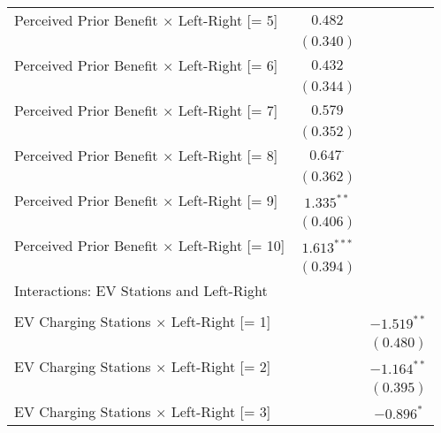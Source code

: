 \begin{center}
\begin{tiny}
\begin{longtable}{l@{} c@{} c@{}}
\quad Perceived Prior Benefit $\times$ Left-Right [= 5]  & $0.482$          &                  \\
                                                         & $(0.340)$        &                  \\
\quad Perceived Prior Benefit $\times$ Left-Right [= 6]  & $0.432$          &                  \\
                                                         & $(0.344)$        &                  \\
\quad Perceived Prior Benefit $\times$ Left-Right [= 7]  & $0.579$          &                  \\
                                                         & $(0.352)$        &                  \\
\quad Perceived Prior Benefit $\times$ Left-Right [= 8]  & $0.647^{\cdot}$  &                  \\
                                                         & $(0.362)$        &                  \\
\quad Perceived Prior Benefit $\times$ Left-Right [= 9]  & $1.335^{**}$     &                  \\
                                                         & $(0.406)$        &                  \\
\quad Perceived Prior Benefit $\times$ Left-Right [= 10] & $1.613^{***}$    &                  \\
                                                         & $(0.394)$        &                  \\
Interactions: EV Stations and Left-Right                 &                  &                  \\
                                                         &                  &                  \\
\quad EV Charging Stations $\times$ Left-Right [= 1]     &                  & $-1.519^{**}$    \\
                                                         &                  & $(0.480)$        \\
\quad EV Charging Stations $\times$ Left-Right [= 2]     &                  & $-1.164^{**}$    \\
                                                         &                  & $(0.395)$        \\
\quad EV Charging Stations $\times$ Left-Right [= 3]     &                  & $-0.896^{*}$     \\

\end{longtable}
\end{tiny}
\end{center}
